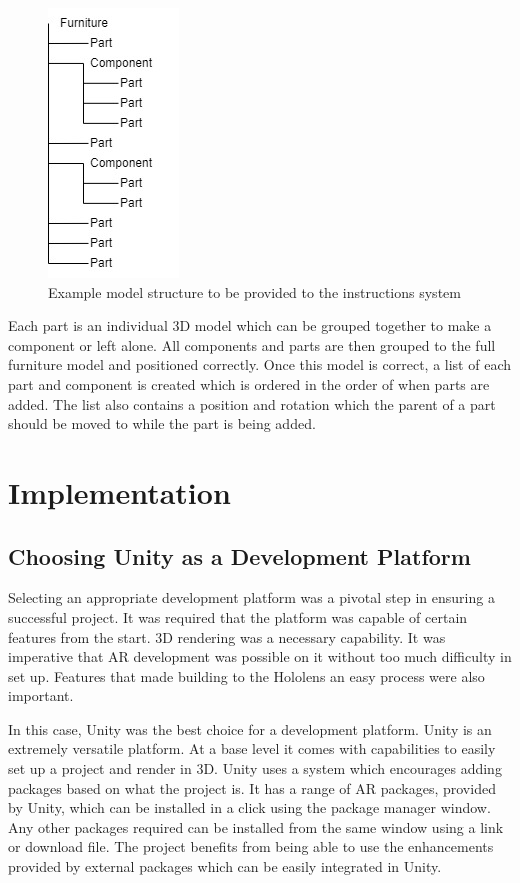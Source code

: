 \documentclass{l4proj}
\begin{document}
\begin{figure}[hbt!]
    \centering
    \includegraphics[width=0.2\linewidth]{dissertation//images/modelFileStructure .jpg}
    \caption{Example model structure to be provided to the instructions system}
    \label{fig:modelStruct}
\end{figure}

Each part is an individual 3D model which can be grouped together to make a component or left alone. All components and parts are then grouped to the full furniture model and positioned correctly. Once this model is correct, a list of each part and component is created which is ordered in the order of when parts are added. The list also contains a position and rotation which the parent of a part should be moved to while the part is being added.


\chapter{Implementation}
\label{chap:implementation}

\section{Choosing Unity as a Development Platform}

Selecting an appropriate development platform was a pivotal step in ensuring a successful project. It was required that the platform was capable of certain features from the start. 3D rendering was a necessary capability. It was imperative that AR development was possible on it without too much difficulty in set up. Features that made building to the Hololens an easy process were also important.

In this case, Unity was the best choice for a development platform. Unity is an extremely versatile platform. At a base level it comes with capabilities to easily set up a project and render in 3D. Unity uses a system which encourages adding packages based on what the project is. It has a range of AR packages, provided by Unity, which can be installed in a click using the package manager window. Any other packages required can be installed from the same window using a link or download file. The project benefits from being able to use the enhancements provided by external packages which can be easily integrated in Unity.
\end{document}
